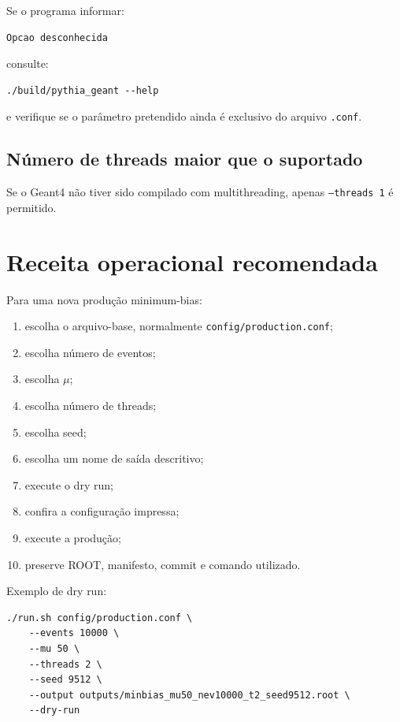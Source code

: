\documentclass[11pt,a4paper]{article}
\begin{document}
Se o programa informar:

\begin{lstlisting}[style=shell]
Opcao desconhecida
\end{lstlisting}

consulte:

\begin{lstlisting}[style=shell]
./build/pythia_geant --help
\end{lstlisting}

e verifique se o parâmetro pretendido ainda é exclusivo do arquivo
\texttt{.conf}.

\subsection{Número de threads maior que o suportado}

Se o Geant4 não tiver sido compilado com multithreading, apenas
\texttt{--threads 1} é permitido.

\section{Receita operacional recomendada}

Para uma nova produção minimum-bias:

\begin{enumerate}
  \item escolha o arquivo-base, normalmente
        \texttt{config/production.conf};
  \item escolha número de eventos;
  \item escolha \(\mu\);
  \item escolha número de threads;
  \item escolha seed;
  \item escolha um nome de saída descritivo;
  \item execute o dry run;
  \item confira a configuração impressa;
  \item execute a produção;
  \item preserve ROOT, manifesto, commit e comando utilizado.
\end{enumerate}

Exemplo de dry run:

\begin{lstlisting}[style=shell]
./run.sh config/production.conf \
    --events 10000 \
    --mu 50 \
    --threads 2 \
    --seed 9512 \
    --output outputs/minbias_mu50_nev10000_t2_seed9512.root \
    --dry-run
\end{lstlisting}
\end{document}
